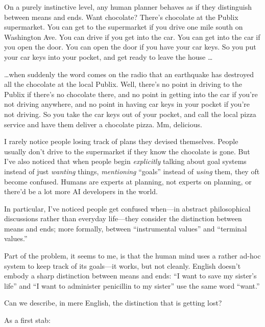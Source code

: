 \myendsectiontext


\bigskip


{
 On a purely instinctive level, any human planner behaves as if
they distinguish between means and ends. Want chocolate?
There's chocolate at the Publix supermarket. You can
get to the supermarket if you drive one mile south on Washington Ave.
You can drive if you get into the car. You can get into the car if you
open the door. You can open the door if you have your car keys. So you
put your car keys into your pocket, and get ready to leave the house
\ldots }

{
 \ldots when suddenly the word comes on the radio that an earthquake
has destroyed all the chocolate at the local Publix. Well,
there's no point in driving to the Publix if
there's no chocolate there, and no point in getting
into the car if you're not driving anywhere, and no
point in having car keys in your pocket if you're not
driving. So you take the car keys out of your pocket, and call the
local pizza service and have them deliver a chocolate pizza. Mm,
delicious.}

{
 I rarely notice people losing track of plans they devised
themselves. People usually don't drive to the
supermarket if they know the chocolate is gone. But
I've also noticed that when people begin
\textit{explicitly} talking about goal systems instead of just
\textit{wanting} things, \textit{mentioning}
``goals'' instead of \textit{using}
them, they oft become confused. Humans are experts at planning, not
experts on planning, or there'd be a lot more AI
developers in the world.}

{
 In particular, I've noticed people get confused
when---in abstract philosophical discussions rather than everyday
life---they consider the distinction between means and ends; more
formally, between ``instrumental
values'' and ``terminal
values.''}

{
 Part of the problem, it seems to me, is that the human mind uses a
rather ad-hoc system to keep track of its goals---it works, but not
cleanly. English doesn't embody a sharp distinction
between means and ends: ``I want to save my
sister's life'' and
``I want to administer penicillin to my
sister'' use the same word
``want.''}

{
 Can we describe, in mere English, the distinction that is getting
lost?}

{
 As a first stab:}

